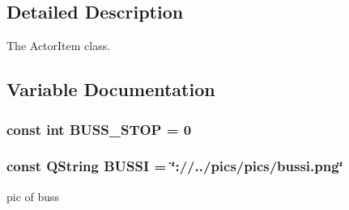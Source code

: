 \subsection{Detailed Description}
The Actor\-Item class. 

\subsection{Variable Documentation}
\hypertarget{actoritem_8hh_a65e7f70d9c573d5bfd13804a406fc067}{
\subsubsection[{B\-U\-S\-S\-\_\-\-S\-T\-O\-P}]{\setlength{\rightskip}{0pt plus 5cm}const int B\-U\-S\-S\-\_\-\-S\-T\-O\-P = 0}}\label{actoritem_8hh_a65e7f70d9c573d5bfd13804a406fc067}
\hypertarget{actoritem_8hh_aedf8524adc61b4d09d86db4fa2f207d2}{
\subsubsection[{B\-U\-S\-S\-I}]{\setlength{\rightskip}{0pt plus 5cm}const Q\-String B\-U\-S\-S\-I = \char`\"{}\-://../pics/pics/bussi.\-png\char`\"{}}}\label{actoritem_8hh_aedf8524adc61b4d09d86db4fa2f207d2}


pic of buss 

